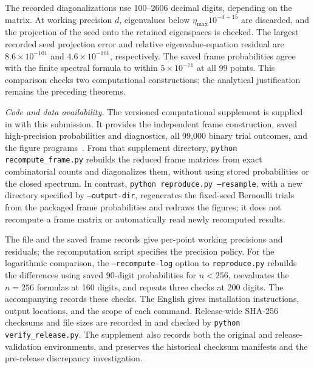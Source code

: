 \documentclass[journal,twocolumn]{IEEEtran}
\theoremstyle{definition}
\theoremstyle{plain}
\begin{document}
The recorded diagonalizations use 100--2606 decimal digits, depending on
the matrix.  At working precision $d$, eigenvalues below
$\eta_{\max}10^{-d+15}$ are discarded, and the projection of the seed
onto the retained eigenspaces is checked.  The largest recorded seed
projection error and relative eigenvalue-equation residual are
$8.6\times10^{-101}$ and $4.6\times10^{-101}$, respectively.
The saved frame probabilities agree with the finite spectral formula
to within $5\times10^{-71}$ at all 99 points.  This comparison checks two
computational constructions; the analytical justification remains the
preceding theorems.

\smallskip
\noindent\emph{Code and data availability.}
The versioned computational supplement is supplied in
 with this submission.  It provides the independent frame construction, saved high-precision
probabilities and diagnostics, all 99,000 binary trial outcomes, and the
figure programs~\cite{ComputationalSupplement}.
From that supplement directory, \texttt{python recompute\_frame.py}
rebuilds the reduced frame matrices from exact combinatorial counts and
diagonalizes them, without using stored probabilities or the closed
spectrum.  In contrast, \texttt{python reproduce.py --resample}, with a
new directory specified by \texttt{--output-dir}, regenerates the fixed-seed Bernoulli trials from the packaged frame
probabilities and redraws the figures; it does not recompute a frame
matrix or automatically read newly recomputed results.

The file  and the saved frame records
give per-point working precisions and residuals; the recomputation script
specifies the precision policy.
For the logarithmic comparison, the \texttt{--recompute-log} option to
\texttt{reproduce.py} rebuilds the differences using saved 90-digit probabilities for $n<256$,
reevaluates the $n=256$ formulas at 160 digits, and repeats three checks
at 200 digits.  The accompanying  records
these checks.
The English  gives installation instructions,
output locations, and the scope of each command.
Release-wide SHA-256 checksums and file sizes are recorded in
 and checked by
\texttt{python verify\_release.py}.  The supplement also records both the
original and release-validation environments, and preserves the historical
checksum manifests and the pre-release discrepancy investigation.
\end{document}
